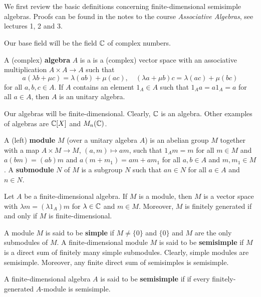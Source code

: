 \chapter{}


We first review the basic definitions concerning
finite-dimensional semisimple algebras. 
Proofs can be found in the
notes to the course \emph{Associative Algebras}, see
lectures 1, 2 and 3. 

Our base field will be the field $\mathbb{C}$ of complex numbers. 

A (complex) \textbf{algebra} $A$ is a is a (complex) vector space  
with an associative multiplication $A\times A\to A$ such that
\[
a(\lambda b+\mu c)=\lambda(ab)+\mu(ac),
\quad
(\lambda a+\mu b)c=\lambda(ac)+\mu (bc)
\]
for all $a,b,c\in A$. If $A$ contains 
an element $1_A\in A$ such that $1_Aa=a1_A=a$ for all $a\in A$, then $A$ is 
an unitary algebra. 

Our algebras will be finite-dimensional. 
Clearly, $\mathbb{C}$ is an algebra. Other 
examples of algebras are $\mathbb{C}[X]$ and $M_n(\mathbb{C})$. 

A (left) \textbf{module} $M$ (over a unitary 
algebra $A$) is an abelian group $M$
together with a map $A\times M\to M$, $(a,m)\mapsto am$, such that
$1_Am=m$ for all $m\in M$ and 
$a(bm)=(ab)m$ and $a(m+m_1)=am+am_1$ for all $a,b\in A$ and $m,m_1\in M$. 
A \textbf{submodule} $N$ of $M$ is a subgroup 
$N$ such that $an\in N$ for all $a\in A$ and $n\in N$. 

\begin{exercise}
Let $A$ be a finite-dimensional algebra. If $M$ 
is a module, then $M$ is a vector space with 
$\lambda m=(\lambda 1_A)m$ for $\lambda\in\mathbb{C}$ and $m\in M$. Moreover, 
$M$ is finitely generated if and only if $M$ is finite-dimensional. 
\end{exercise}

A module $M$ is said to be \textbf{simple} if $M\ne\{0\}$ and $\{0\}$ and $M$ 
are the only submodules of $M$.	
A finite-dimensional module $M$  
is said to be \textbf{semisimple} if $M$ is a direct sum of 
finitely many simple submodules. 
Clearly, simple modules are semisimple. Moreover, any finite direct sum of semisimples is semisimple. 


A finite-dimensional algebra $A$ is said to be \textbf{semisimple} if
if every finitely-generated $A$-module is semisimple. 

